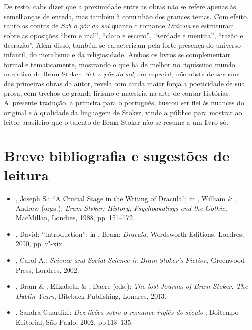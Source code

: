 De resto, cabe dizer que a proximidade entre as obras não se refere
apenas às semelhanças de enredo, mas também à comunhão dos grandes
temas. Com efeito, tanto os contos de \emph{Sob o pôr do sol} quanto o
romance \emph{Drácula} se estruturam sobre as oposições ``bem e mal'',
``claro e escuro'', ``verdade e mentira'', ``razão e desrazão''. Além
disso, também se caracterizam pela forte presença do universo infantil,
do moralismo e da religiosidade. Ambos os livros se complementam formal
e tematicamente, mostrando o que há de melhor no riquíssimo mundo
narrativo de Bram Stoker. \emph{Sob o pôr do sol}, em especial, não
obstante ser uma das primeiras obras do autor, revela com ainda maior
força a poeticidade de sua prosa, com trechos de grande lirismo e
maestria na arte de contar histórias. A~presente tradução, a primeira
para o português, buscou ser fiel às nuances do original e à
qualidade da linguagem de Stoker, vindo a público para mostrar ao leitor
brasileiro que o talento de Bram Stoker não se resume a um livro só.

\asterisc{}
  



\section{Breve bibliografia e sugestões de leitura}


\begin{itemize}
\small
\item
  , Joseph S.: ``A Crucial Stage in the Writing of Dracula''; in
  , William \& , Andrew (orgs.): \emph{Bram Stoker: History,
  Psychoanalisys and the Gothic}, MacMillan, Londres, 1988, pp\,  151--172.
\item
  , David: ``Introduction''; in , Bram: \emph{Dracula},
  Wordsworth Editions, Londres, 2000, pp\, v"-xix.
\item
  , Carol A.: \emph{Science and Social Science in Bram Stoker's
  Fiction}, Greenwood Press, Londres, 2002.
\item
  , Bram \& , Elizabeth \& , Dacre (eds.): \emph{The
  lost Journal of Bram Stoker: The Dublin Years}, Biteback Publishing,
  Londres, 2013.
\item
  , Sandra Guardini: \emph{Dez lições sobre o romance inglês
  do século }, Boitempo Editorial, São Paulo, 2002, pp\,118--135.
\end{itemize}
